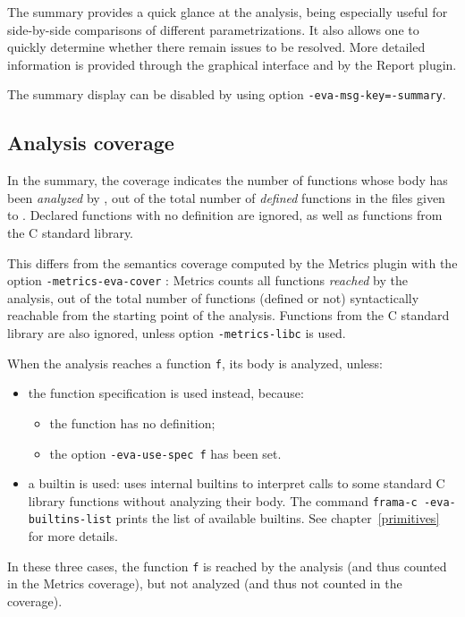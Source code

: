 \documentclass{frama-c-book}
\begin{document}
The summary provides a quick glance at the analysis, being especially useful
for side-by-side comparisons of different parametrizations. It also allows
one to quickly determine whether there remain issues to be resolved.
More detailed information is provided through the graphical interface and
by the Report plugin.

The summary display can be disabled by using option
\lstinline|-eva-msg-key=-summary|.

\subsection{Analysis coverage} \label{coverage}

In the \Eva{} summary, the coverage indicates the number of functions whose
body has been \emph{analyzed} by \Eva{}, out of the total number of
\emph{defined} functions in the files given to \FramaC.
Declared functions with no definition are ignored, as well as functions from the
C standard library.

This differs from the semantics coverage computed by the \textsf{Metrics} plugin
with the option \lstinline|-metrics-eva-cover| : \textsf{Metrics} counts all
functions \emph{reached} by the \Eva{} analysis, out of the total number
of functions (defined or not) syntactically reachable from the starting point
of the analysis.
Functions from the C standard library are also ignored, unless option
\lstinline|-metrics-libc| is used.

When the \Eva{} analysis reaches a function \lstinline|f|,
its body is analyzed, unless:
\begin{itemize}
  \item the function specification is used instead, because:
  \begin{itemize}
    \item the function has no definition;
    \item the option \lstinline|-eva-use-spec f| has been set.
  \end{itemize}
  \item a builtin is used: \Eva{} uses internal builtins to interpret calls to
  some standard C library functions without analyzing their body.
  The command \lstinline|frama-c -eva-builtins-list| prints the list of
  available \Eva{} builtins.
  See chapter \ref{primitives} for more details.
\end{itemize}

In these three cases, the function \lstinline|f| is reached by the analysis
(and thus counted in the \textsf{Metrics} coverage), but not analyzed
(and thus not counted in the \Eva{} coverage).
\end{document}
